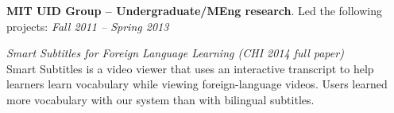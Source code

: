 \documentclass[margin,line]{resume}
\begin{document}
\begin{resume}
%

\textbf{MIT UID Group -- Undergraduate/MEng research}. Led the following projects: \hfill \textsl{Fall 2011 -- Spring 2013}

\vspace{-2mm}

\textit{Smart Subtitles for Foreign Language Learning (CHI 2014 full paper)}\\ %
Smart Subtitles is a video viewer that uses an interactive transcript to help learners learn vocabulary while viewing foreign-language videos. Users learned more vocabulary with our system than with bilingual subtitles.


\vspace{-2mm}


\end{resume}
\end{document}
